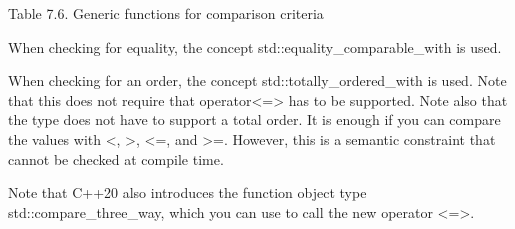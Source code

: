 \begin{center}
Table 7.6. Generic functions for comparison criteria
\end{center}

When checking for equality, the concept std::equality\_comparable\_with is used.

When checking for an order, the concept std::totally\_ordered\_with is used. Note that this does not require that operator<=> has to be supported. Note also that the type does not have to support a total order. It is enough if you can compare the values with <, >, <=, and >=. However, this is a semantic constraint that cannot be checked at compile time.

Note that C++20 also introduces the function object type std::compare\_three\_way, which you can use to call the new operator <=>.